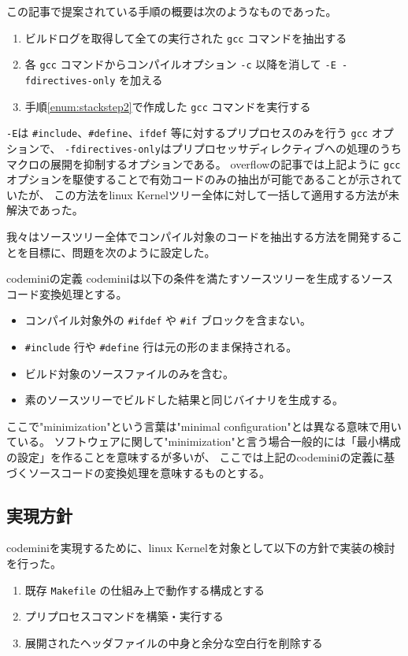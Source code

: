 この記事で提案されている手順の概要は次のようなものであった。
\begin{enumerate}
  \item ビルドログを取得して全ての実行された \verb|gcc| コマンドを抽出する
  \item 各 \verb|gcc| コマンドからコンパイルオプション \verb|-c| 以降を消して \verb|-E -fdirectives-only| を加える \label{enum:stackstep2}
  \item 手順\ref{enum:stackstep2}で作成した \verb|gcc| コマンドを実行する
\end{enumerate}
\par
\verb|-E|は \verb|#include|、\verb|#define|、\verb|ifdef| 等に対するプリプロセスのみを行う \verb|gcc| オプションで、
\verb|-fdirectives-only|はプリプロセッサディレクティブへの処理のうちマクロの展開を抑制するオプションである。
\acrshort{overflow}の記事では上記ように \verb|gcc| オプションを駆使することで有効コードのみの抽出が可能であることが示されていたが、
この方法を\acrshort{linux} Kernelツリー全体に対して一括して適用する方法が未解決であった。
\par
我々はソースツリー全体でコンパイル対象のコードを抽出する方法を開発することを目標に、問題を次のように設定した。
\begin{itembox}[l]{\acrshort{codemini}の定義}
\acrshort{codemini}は以下の条件を満たすソースツリーを生成するソースコード変換処理とする。
\begin{itemize}
  \item コンパイル対象外の \verb|#ifdef| や \verb|#if| ブロックを含まない。
  \item \verb|#include| 行や \verb|#define| 行は元の形のまま保持される。
  \item ビルド対象のソースファイルのみを含む。
  \item 素のソースツリーでビルドした結果と同じバイナリを生成する。
\end{itemize}
\end{itembox}
\par
ここで"minimization"という言葉は"minimal configuration"とは異なる意味で用いている。
ソフトウェアに関して"minimization"と言う場合一般的には「最小構成の設定」を作ることを意味するが多いが、
ここでは上記の\acrshort{codemini}の定義に基づくソースコードの変換処理を意味するものとする。
\subsection{実現方針}
\acrshort{codemini}を実現するために、\acrshort{linux} Kernelを対象として以下の方針で実装の検討を行った。
\begin{enumerate}[label=(\roman*)]
  \item 既存 \verb|Makefile| の仕組み上で動作する構成とする \label{enum:makefile}
  \item プリプロセスコマンドを構築・実行する \label{enum:preprocess}
  \item 展開されたヘッダファイルの中身と余分な空白行を削除する \label{enum:postprocess}
\end{enumerate}
